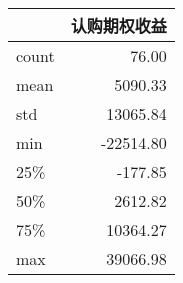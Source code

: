 \begin{tabular}{lr}
\toprule
{} &    认购期权收益 \\
\midrule
count &     76.00 \\
mean  &   5090.33 \\
std   &  13065.84 \\
min   & -22514.80 \\
25\%   &   -177.85 \\
50\%   &   2612.82 \\
75\%   &  10364.27 \\
max   &  39066.98 \\
\bottomrule
\end{tabular}
